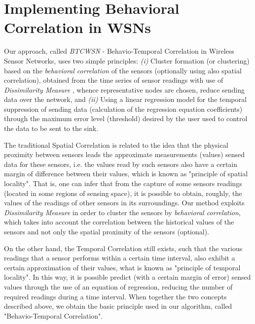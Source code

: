 \documentclass[conference]{IEEEtran}
\begin{document}
\section{Implementing Behavioral Correlation in WSNs}

Our approach, called \textit{BTCWSN} - Behavio-Temporal Correlation in Wireless
Sensor Networks, uses two simple principles:
{\it (i)} Cluster formation (or clustering) based on the \textit{behavioral
correlation} of the sensors (optionally using also spatial correlation),
obtained from the time series of sensor readings with use of
\textit{Dissimilarity Measure} \cite{Liu2007}, whence representative nodes are
chosen, reduce sending data over the network, and {\it (ii)} Using a linear
regression model for the temporal suppression of sending data (calculation of
the regression equation coefficients) through the maximum error level
(threshold) desired by the user used to control the data to be sent to the sink.

The traditional Spatial Correlation is related to the idea that the physical
proximity between sensors leads the approximate measurements (values) sensed data for
these sensors, i.e. the values read by such sensors also have a certain margin
of difference between their values, which is known as "principle of spatial
locality". That is, one can infer that from the capture of some sensors readings
(located in some regions of sensing space), it is possible to obtain, roughly,
the values of the readings of other sensors in its surroundings.
Our method exploits \textit{Dissimilarity Measure} \cite{Liu2007} in order to
cluster the sensors by \textit{behavioral correlation}, which takes into account
the correlation between the historical values of the sensors and not only the
spatial proximity of the sensors (optional).

On the other hand, the Temporal Correlation still exists, such that the various
readings that a sensor performs within a certain time interval, also exhibit a
certain approximation of their values, what is known as "principle of temporal
locality". In this way, it is possible predict (with a certain margin of
error) sensed values through the use of an equation of regression, reducing the
number of required readings during a time interval. When together the two
concepts described above, we obtain the basic principle used in our algorithm,
called "Behavio-Temporal Correlation".
\end{document}
